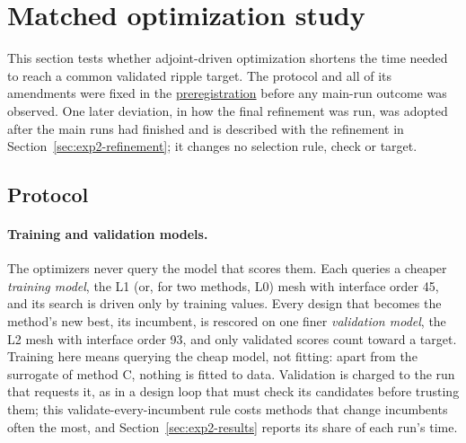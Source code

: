 \section{Matched optimization study}\label{sec:optimization}
This section tests whether adjoint-driven optimization shortens the time
needed to reach a common validated ripple target. The protocol and all of
its amendments were fixed in the
\href{https://github.com/rjwalters/geode-fem/issues/1185}{preregistration}
before any main-run outcome was observed. One later deviation, in how the
final refinement was run, was adopted after the main runs had finished and
is described with the refinement in Section~\ref{sec:exp2-refinement}; it
changes no selection rule, check or target.

\subsection{Protocol}
\paragraph{Training and validation models.}
The optimizers never query the model that scores them. Each queries a
cheaper \emph{training model}, the L1 (or, for two methods, L0) mesh with
interface order 45, and its search is driven only by training values. Every
design that becomes the method's new best, its incumbent, is rescored on one
finer \emph{validation model}, the L2 mesh with interface order 93, and only
validated scores count toward a target. Training here means querying the
cheap model, not fitting: apart from the surrogate of method C, nothing is
fitted to data. Validation is charged to the run that requests it, as in a
design loop that must check its candidates before trusting them; this
validate-every-incumbent rule costs methods that change incumbents often
the most, and Section~\ref{sec:exp2-results} reports its share of each
run's time.

